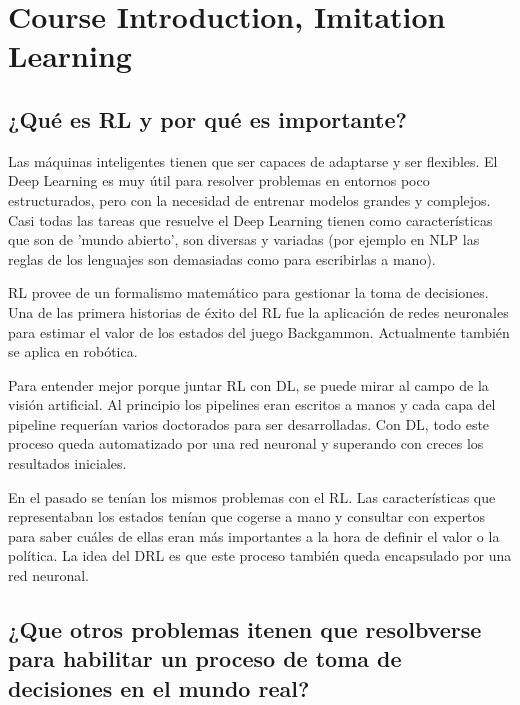 \chapter{Course Introduction, Imitation Learning}


\section{¿Qué es RL y por qué es importante?}%
\label{sec:_qué_es_rl_y_por_qué_es_importante_}

Las máquinas inteligentes tienen que ser capaces de adaptarse y ser flexibles. El Deep Learning es
muy útil para resolver problemas en entornos poco estructurados, pero con la necesidad de entrenar
modelos grandes y complejos. Casi todas las tareas que resuelve el Deep Learning tienen como
características que son de 'mundo abierto', son diversas y variadas (por ejemplo en NLP las reglas
de los lenguajes son demasiadas como para escribirlas a mano). 

RL provee de un formalismo matemático para gestionar la toma de decisiones. Una de las primera
historias de éxito del RL fue la aplicación de redes neuronales para estimar el valor de los estados
del juego Backgammon. Actualmente también se aplica en robótica.

Para entender mejor porque juntar RL con DL, se puede mirar al campo de la visión artificial. Al
principio los pipelines eran escritos a manos y cada capa del pipeline requerían varios doctorados
para ser desarrolladas. Con DL, todo este proceso queda automatizado por una red neuronal y
superando con creces los resultados iniciales.

En el pasado se tenían los mismos problemas con el RL. Las características que representaban los
estados tenían que cogerse a mano y consultar con expertos para saber cuáles de ellas eran más
importantes a la hora de definir el valor o la política. La idea del DRL es que este proceso también
queda encapsulado por una red neuronal.

\section{¿Que otros problemas itenen que resolbverse para habilitar un proceso de toma de
decisiones en el mundo real?}%
\label{sec:_que_otros_problemas_itenen_que_resolbverse_para_habilitar_un_proceso_de_toma_de_decisiones_en_el_mundo_real_}

